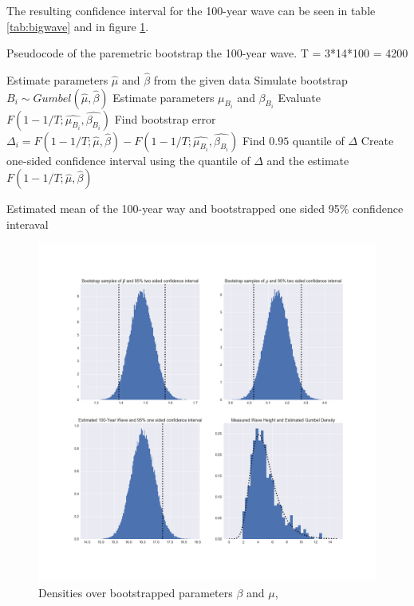 \documentclass[a4paper]{article}
\begin{document}
The resulting confidence interval for the 100-year wave can be seen in table \ref{tab:bigwave} and in figure \ref{fig:bootstrap_res}.

\begin{algorithm}
    \caption{Pseudocode of the paremetric bootstrap the 100-year wave. T = 3*14*100 = 4200}
    \begin{algorithmic}
        \State Estimate parameters $\hat{\mu}$ and $\hat{\beta}$ from the given data
        \State Simulate bootstrap $B_i \sim Gumbel(\hat{\mu}, \hat{\beta})$
        \State Estimate parameters $\mu_{B_i}$ and $\beta_{B_i}$
        \State Evaluate $F(1-1/T; \hat{\mu_{B_i}}, \hat{\beta_{B_i}})$
        \State Find bootstrap error $\Delta_i = F(1-1/T; \hat{\mu}, \hat{\beta}) - F(1-1/T; \hat{\mu_{B_i}}, \hat{\beta_{B_i}})$
        \EndFor
        \State Find $0.95$ quantile of $\Delta$
        \State Create one-sided confidence interval using the quantile of $\Delta$ and the estimate $F(1-1/T; \hat{\mu}, \hat{\beta})$
    \end{algorithmic}
\end{algorithm}

\begin{table}[H]
    \centering
    \caption{Estimated mean of the 100-year way and bootstrapped one sided 95\% confidence interaval}
    \label{tab:bigwave}
    
\end{table}

\begin{figure}[H]
    \centering
    \includegraphics[width = 1.0\textwidth]{images/results_bootstrap.png}
    \caption{Densities over bootstrapped parameters $\beta$ and $\mu$, }
    \label{fig:bootstrap_res}
\end{figure}
\end{document}
